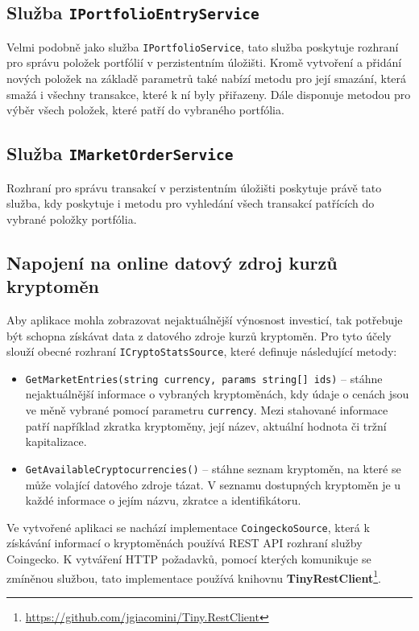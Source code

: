 \documentclass[12pt, a4paper]{article}
\begin{document}
    \subsection{Služba \texttt{IPortfolioEntryService}}
    Velmi podobně jako služba \texttt{IPortfolioService}, tato služba poskytuje rozhraní pro správu položek portfólií v perzistentním úložišti.
    Kromě vytvoření a přidání nových položek na základě parametrů také nabízí metodu pro její smazání, která smažá i všechny transakce, které k ní byly přiřazeny. 
    Dále disponuje metodou pro výběr všech položek, které patří do vybraného portfólia.
    
    \subsection{Služba \texttt{IMarketOrderService}}
    Rozhraní pro správu transakcí v perzistentním úložišti poskytuje právě tato služba, kdy poskytuje i metodu pro vyhledání všech transakcí patřících do vybrané položky portfólia.

    \subsection{Napojení na online datový zdroj kurzů kryptoměn}
    Aby aplikace mohla zobrazovat nejaktuálnější výnosnost investicí, tak potřebuje být schopna získávat data z datového zdroje kurzů kryptoměn.
    Pro tyto účely slouží obecné rozhraní \texttt{ICryptoStatsSource}, které definuje následující metody:

    \begin{itemize}
        \item \texttt{GetMarketEntries(string currency, params string[] ids)} -- stáhne nejaktuálnější informace o vybraných kryptoměnách, kdy údaje o cenách jsou ve měně vybrané pomocí parametru \texttt{currency}.
        Mezi stahované informace patří například zkratka kryptoměny, její název, aktuální hodnota či tržní kapitalizace.
        \item \texttt{GetAvailableCryptocurrencies()} -- stáhne seznam kryptoměn, na které se může volající datového zdroje tázat.
        V seznamu dostupných kryptoměn je u každé informace o jejím názvu, zkratce a identifikátoru.
    \end{itemize}

    Ve vytvořené aplikaci se nachází implementace \texttt{CoingeckoSource}, která k získávání informací o kryptoměnách používá REST API rozhraní služby Coingecko.
    K vytváření HTTP požadavků, pomocí kterých komunikuje se zmíněnou službou, tato implementace používá knihovnu \textbf{TinyRestClient}\footnote{\url{https://github.com/jgiacomini/Tiny.RestClient}}.
    
\end{document}
